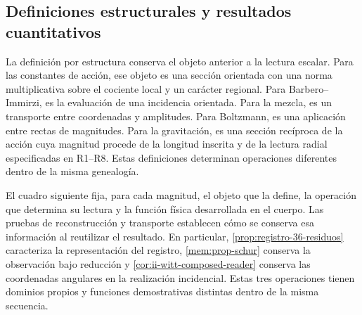 \subsection{Definiciones estructurales y resultados cuantitativos}
\label{sec:ii-conclusiones-cuantitativas}

La definición por estructura conserva el objeto anterior a la lectura
escalar. Para las constantes de acción, ese objeto es una sección orientada
con una norma multiplicativa sobre el cociente local y un carácter regional.
Para Barbero--Immirzi, es
la evaluación de una incidencia orientada. Para la mezcla, es un transporte
entre coordenadas y amplitudes. Para Boltzmann, es una aplicación entre
rectas de magnitudes. Para la gravitación, es una sección recíproca de la
acción cuya magnitud procede de la longitud inscrita y de la lectura
radial especificadas en R1--R8. Estas definiciones
determinan operaciones diferentes dentro de la misma genealogía.

El cuadro siguiente fija, para cada magnitud, el objeto que la define,
la operación que determina su lectura y la función física desarrollada
en el cuerpo. Las pruebas de reconstrucción y transporte establecen
cómo se conserva esa información al reutilizar el resultado. En
particular, \ref{prop:registro-36-residuos} caracteriza la representación
del registro, \ref{mem:prop-schur} conserva la observación bajo reducción
y \ref{cor:ii-witt-composed-reader} conserva las coordenadas angulares
en la realización incidencial. Estas tres operaciones tienen dominios
propios y funciones demostrativas distintas dentro de la misma secuencia.

